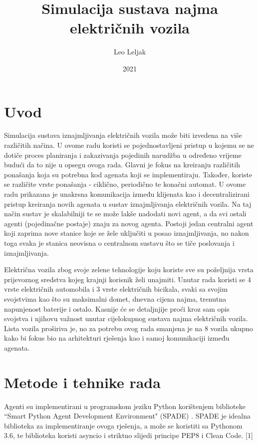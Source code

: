 \documentclass{foi}
\title{Simulacija sustava najma električnih vozila}
\author{Leo Leljak}
\date{2021}
\begin{document}
\maketitle

\tableofcontents

\pagestyle{plain}
\chapter{Uvod}

Simulacija sustava iznajmljivanja električnih vozila može biti izvedena na više različitih načina. U ovome radu koristi se pojednostavljeni pristup u kojemu se ne dotiče proces planiranja i zakazivanja pojedinih narudžba u određeno vrijeme budući da to nije u opsegu ovoga rada. Glavni je fokus na kreiranju različitih ponašanja koja su potrebna kod agenata koji se implementiraju. Također, koriste se različite vrste ponašanja - ciklično, periodično te konačni automat. U ovome radu prikazana je unakrsna komunikacija između klijenata kao i decentralizirani pristup kreiranja novih agenata u sustav iznajmljivanja električnih vozila. Na taj način sustav je skalabilniji te se može lakše nadodati novi agent, a da svi ostali agenti (pojedinačne postaje) znaju za novog agenta. Postoji jedan centralni agent koji zaprima nove stanice koje se žele uključiti u posao iznajmljivanja, no nakon toga svaka je stanica neovisna o centralnom sustavu što se tiče poslovanja i iznajmljivanja. 

Električna vozila zbog svoje zelene tehnologije koju koriste sve su poželjnija vrsta prijevoznog sredstva kojeg krajnji korisnik želi unajmiti. Unutar rada koristi se 4 vrste električnih automobila i 3 vrste električnih bicikala, svaki sa svojim svojstvima kao što su maksimalni domet, dnevna cijena najma, trenutna napunjenost baterije i ostalo. Kasnije će se detaljnjije proći kroz sam opis svojstva i njihovu važnost unutar cijelokupnog sustava najma električnih vozila. Lista vozila proširiva je, no za potrebu ovog rada smanjena je na 8 vozila ukupno kako bi fokus bio na arhitekturi rješenja kao i samoj komunikaciji između agenata.

\chapter{Metode i tehnike rada}

Agenti su implementirani u programskom jeziku Python korištenjem biblioteke “Smart Python Agent Development Environment" (SPADE) . SPADE je idealna biblioteka za implementiranje ovoga rješenja, a može se koristiti sa Pythonom 3.6, te biblioteka koristi asyncio i striktno slijedi principe PEP8 i Clean Code. [1]
\end{document}
